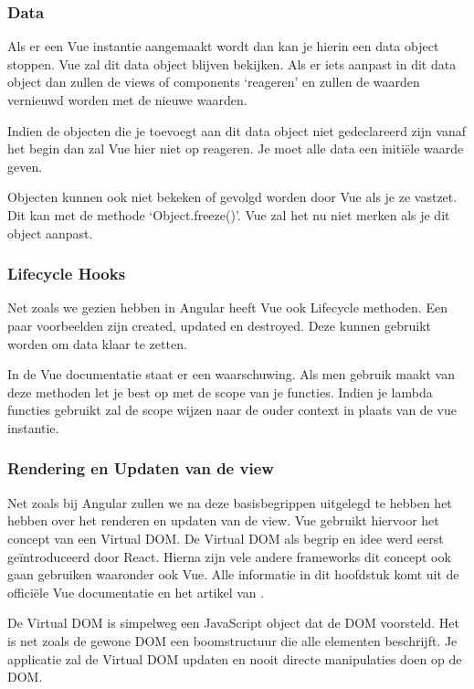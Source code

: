 \subsubsection{Data}
\label{sec:Vue_Data}
Als er een Vue instantie aangemaakt wordt dan kan je hierin een data object stoppen. Vue zal dit data object blijven bekijken. Als er iets aanpast in dit data object dan zullen de views of components ‘reageren’ en zullen de waarden vernieuwd worden met de nieuwe waarden.

Indien de objecten die je toevoegt aan dit data object niet gedeclareerd zijn vanaf het begin dan zal Vue hier niet op reageren. Je moet alle data een initiële waarde geven.

Objecten kunnen ook niet bekeken of gevolgd worden door Vue als je ze vastzet. Dit kan met de methode ‘Object.freeze()’. Vue zal het nu niet merken als je dit object aanpast.

\subsubsection{Lifecycle Hooks}
\label{sec:Vue_Lifecycle}
Net zoals we gezien hebben in Angular heeft Vue ook Lifecycle methoden. Een paar voorbeelden zijn created, updated en destroyed. Deze kunnen gebruikt worden om data klaar te zetten.

In de Vue documentatie staat er een waarschuwing. Als men gebruik maakt van deze methoden let je best op met de scope van je functies. Indien je lambda functies gebruikt zal de scope wijzen naar de ouder context in plaats van de vue instantie.

\subsubsection{Rendering en Updaten van de view}
\label{sec:Vue_Rendering_Updaten}
Net zoals bij Angular zullen we na deze basisbegrippen uitgelegd te hebben het hebben over het renderen en updaten van de view. Vue gebruikt hiervoor het concept van een Virtual DOM. De Virtual DOM als begrip en idee werd eerst geïntroduceerd door React. Hierna zijn vele andere frameworks dit concept ook gaan gebruiken waaronder ook Vue. Alle informatie in dit hoofdstuk komt uit de officiële Vue documentatie \autocite{_vue_2018-1} en het artikel van \textcite{mikami_medium_2017}.

De Virtual DOM is simpelweg een JavaScript object dat de DOM voorsteld. Het is net zoals de gewone DOM een boomstructuur die alle elementen beschrijft. Je applicatie zal de Virtual DOM updaten en nooit directe manipulaties doen op de DOM.

